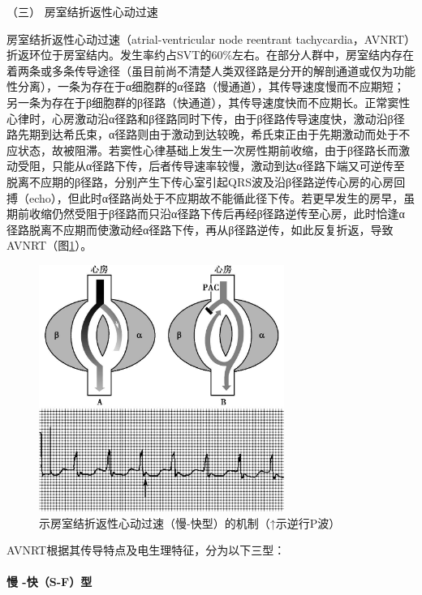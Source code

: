 \hypertarget{text00289.htmlux5cux23CHP10-2-2-1-1-3}{}
（三） 房室结折返性心动过速

房室结折返性心动过速（atrial-ventricular node reentrant
tachycardia，AVNRT）折返环位于房室结内。发生率约占SVT的60\%左右。在部分人群中，房室结内存在着两条或多条传导途径（虽目前尚不清楚人类双径路是分开的解剖通道或仅为功能性分离），一条为存在于α细胞群的α径路（慢通道），其传导速度慢而不应期短；另一条为存在于β细胞群的β径路（快通道），其传导速度快而不应期长。正常窦性心律时，心房激动沿α径路和β径路同时下传，由于β径路传导速度快，激动沿β径路先期到达希氏束，α径路则由于激动到达较晚，希氏束正由于先期激动而处于不应状态，故被阻滞。若窦性心律基础上发生一次房性期前收缩，由于β径路长而激动受阻，只能从α径路下传，后者传导速率较慢，激动到达α径路下端又可逆传至脱离不应期的β径路，分别产生下传心室引起QRS波及沿β径路逆传心房的心房回搏（echo），但此时α径路尚处于不应期故不能循此径下传。若更早发生的房早，虽期前收缩仍然受阻于β径路而只沿α径路下传后再经β径路逆传至心房，此时恰逢α径路脱离不应期而使激动经α径路下传，再从β径路逆传，如此反复折返，导致AVNRT（图\ref{fig102-1}）。

\begin{figure}[!htbp]
 \centering
 \includegraphics[width=3.14583in,height=3.16667in]{./images/Image00412.jpg}
 \captionsetup{justification=centering}
 \caption{示房室结折返性心动过速（慢-快型）的机制（↑示逆行P波）}
 \label{fig102-1}
  \end{figure} 



AVNRT根据其传导特点及电生理特征，分为以下三型：

\paragraph{慢 -快（S-F）型}

